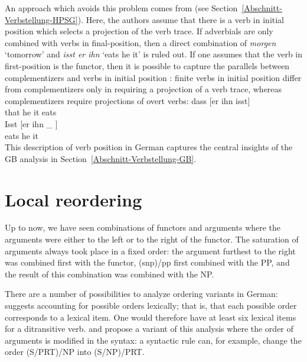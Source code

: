 \zl
An approach which avoids this problem comes from \citet{KW91a} (see
Section~\ref{Abschnitt-Verbstellung-HPSG}). Here, the authors assume that there is a verb in initial
position which selects a projection of the verb trace. If adverbials are only combined with verbs in
final-position, then a direct combination of \emph{morgen} `tomorrow' and \emph{isst er ihn} `eats he
it' is ruled out. If one assumes that the verb in first-position is the functor, then it is possible to capture the
parallels between complementizers and verbs in initial position
\citep{Hoehle97a}: finite verbs in initial position differ from complementizers only in requiring
a projection of a verb trace, whereas complementizers require projections of overt verbs: 
\eal
\ex 
\gll dass [er ihn isst]\\
     that \spacebr{}he it eats\\
\ex 
\gll Isst [er ihn \_ ]\\
     eats \spacebr{}he it\\
\zl
This description of verb position in German captures the central insights of the GB analysis in Section~\ref{Abschnitt-Verbstellung-GB}.

\section{Local reordering}
\label{Abschnitt-CG-lokale-Umstellung}

Up to now, we have seen combinations of functors and arguments where the arguments were either to the left or to the right of the functor. The
saturation of arguments always took place in a fixed order: the argument furthest to the right was
combined first with the functor, \eg (s\bs np)/pp first combined with
the PP, and the result of this combination was combined with the NP.

There are a number of possibilities to analyze ordering variants in German: \citet{Uszkoreit86b} suggests accounting for possible orders lexically; that is, that
each possible order corresponds to a lexical item. One would therefore have at least six lexical items for a ditransitive verb. \citet[]{Briscoe2000a} and 
\citet[--98]{Villavicencio2002a} propose a variant of this analysis where the order of arguments is modified in the syntax: a syntactic rule can, for example, change
the order (S/PRT)/NP into (S/NP)/PRT.


